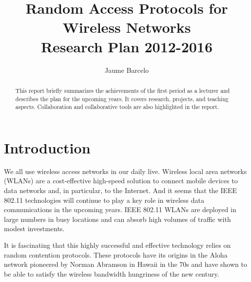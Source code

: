 \documentclass[a4paper,twocolumns]{article}%
\begin{document}
\title{Random Access Protocols for Wireless Networks\\ Research Plan 2012-2016}

\author{Jaume Barcelo}


\date{}

\maketitle

\begin{abstract}
This report briefly summarizes the achievements of the first period as a lecturer and describes the plan for the upcoming years.
It covers research, projects, and teaching aspects.
Collaboration and collaborative tools are also highlighted in the report.



\end{abstract}

\tableofcontents

\clearpage


\section{Introduction}

We all use wireless access networks in our daily live.
Wireless local area networks (WLANs) are a cost-effective high-speed solution to connect mobile devices to data networks and, in particular, to the Internet.
And it seems that the IEEE 802.11 technologies will continue to play a key role in wireless data communications in the upcoming years.
IEEE 802.11 WLANs are deployed in large numbers in busy locations and can absorb high volumes of traffic with modest investments.

It is fascinating that this highly successful and effective technology relies on random contention protocols.
These protocols have its origins in the Aloha network pioneered by Norman Abramson in Hawaii in the 70s and have shown to be able to satisfy the wireless bandwidth hungriness of the new century.
\end{document}
